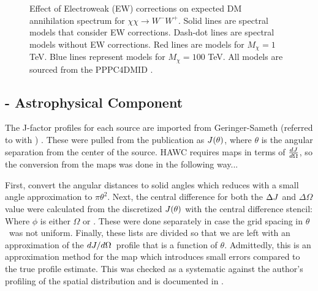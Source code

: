 \begin{figure}[t]
\caption{Effect of Electroweak (EW) corrections on expected DM annihilation spectrum for $\chi\chi \rightarrow W^-W^+$. Solid lines are spectral models that consider EW corrections. Dash-dot lines are spectral models without EW corrections. Red lines are models for $M_\chi = 1$ TeV. Blue lines represent models for $M_\chi = 100$ TeV. All models are sourced from the PPPC4DMID \cite{Cirelli_2011}.}
\label{fig:ew_vs_noew}
\end{figure}

\subsection{\J - Astrophysical Component}\label{sec:gd_spatialmodel}

The J-factor profiles for each source are imported from Geringer-Sameth (referred to with \GS) \cite{Geringer_Sameth_2015}.
These were pulled from the publication as $J(\theta)$, where $\theta$ is the angular separation from the center of the source.
HAWC requires maps in terms of $\frac{dJ}{d\Omega}$, so the conversion from the maps was done in the following way...

First, convert the angular distances to solid angles
\angleTOsolidangle
which reduces with a small angle approximation to $\pi \theta^2$.
Next, the central difference for both the $\Delta J$ and $\Delta \Omega$ value were calculated from the discretized $J(\theta)$ with the central difference stencil:
\centerDiff
Where $\phi$ is either $\Omega$ or \J.
These were done separately in case the grid spacing in $\theta$~was not uniform.
Finally, these lists are divided so that we are left with an approximation of the $dJ/d\Omega$~profile that is a function of $\theta$.
Admittedly, this is an approximation method for the map which introduces small errors compared to the true profile estimate.
This was checked as a systematic against the author's profiling of the spatial distribution and is documented in .

